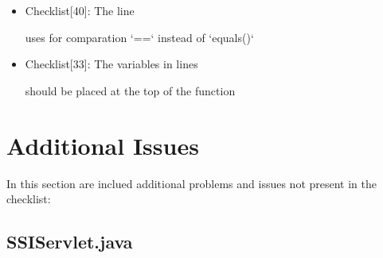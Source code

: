 \documentclass[11pt,titlepage]{article} %
\begin{document}
\begin{itemize}
   \item Checklist[40]: The line
    
    uses for comparation `==` instead of `equals()`
   \item Checklist[33]: The variables in lines
    
    should be placed at the top of the function

  \end{itemize}
\newpage
\section{Additional Issues}
  In this section are inclued additional problems and issues not present in the checklist:
  \subsection{SSIServlet.java}
\end{document}
